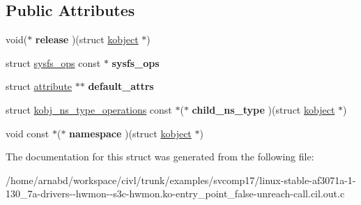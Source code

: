 \subsection*{Public Attributes}
\begin{DoxyCompactItemize}
\item 
\hypertarget{structkobj__type_abfaafa74bd34791fa7b8328a630c8b58}{}void($\ast$ {\bfseries release} )(struct \hyperlink{structkobject}{kobject} $\ast$)\label{structkobj__type_abfaafa74bd34791fa7b8328a630c8b58}

\item 
\hypertarget{structkobj__type_a1507b3a47687c09bc10de7851386f8ed}{}struct \hyperlink{structsysfs__ops}{sysfs\+\_\+ops} const $\ast$ {\bfseries sysfs\+\_\+ops}\label{structkobj__type_a1507b3a47687c09bc10de7851386f8ed}

\item 
\hypertarget{structkobj__type_ad6ee7f5a2d007cefa07a0346bd43bc27}{}struct \hyperlink{structattribute}{attribute} $\ast$$\ast$ {\bfseries default\+\_\+attrs}\label{structkobj__type_ad6ee7f5a2d007cefa07a0346bd43bc27}

\item 
\hypertarget{structkobj__type_ae583e9ad70c1ce4254a2cf0636e42ace}{}struct \hyperlink{structkobj__ns__type__operations}{kobj\+\_\+ns\+\_\+type\+\_\+operations} const $\ast$($\ast$ {\bfseries child\+\_\+ns\+\_\+type} )(struct \hyperlink{structkobject}{kobject} $\ast$)\label{structkobj__type_ae583e9ad70c1ce4254a2cf0636e42ace}

\item 
\hypertarget{structkobj__type_a23b61264633ccfbe9e7a31dd3177159d}{}void const $\ast$($\ast$ {\bfseries namespace} )(struct \hyperlink{structkobject}{kobject} $\ast$)\label{structkobj__type_a23b61264633ccfbe9e7a31dd3177159d}

\end{DoxyCompactItemize}


The documentation for this struct was generated from the following file\+:\begin{DoxyCompactItemize}
\item 
/home/arnabd/workspace/civl/trunk/examples/svcomp17/linux-\/stable-\/af3071a-\/1-\/130\+\_\+7a-\/drivers-\/-\/hwmon-\/-\/s3c-\/hwmon.\+ko-\/entry\+\_\+point\+\_\+false-\/unreach-\/call.\+cil.\+out.\+c\end{DoxyCompactItemize}
